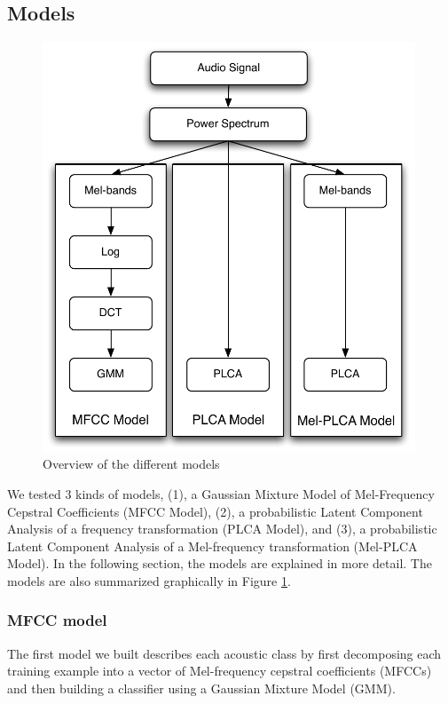 \documentclass[a4paper,11pt,final]{ThesisStyle}
\begin{document}
\subsection{Models}

\begin{figure}
\centering
\includegraphics[width=0.99\textwidth]{images/models.pdf}
\caption{Overview of the different models}
\label{fig:models}
\end{figure}


We tested 3 kinds of models, (1), a Gaussian Mixture Model of Mel-Frequency Cepstral Coefficients (MFCC Model), (2), a probabilistic Latent Component Analysis of a frequency transformation (PLCA Model), and (3), a probabilistic Latent Component Analysis of a Mel-frequency transformation (Mel-PLCA Model).  In the following section, the models are explained in more detail.  The models are also summarized graphically in Figure \ref{fig:models}.

\subsubsection{MFCC model}
The first model we built describes each acoustic class by first decomposing each training example into a vector of Mel-frequency cepstral coefficients (MFCCs) and then building a classifier using a Gaussian Mixture Model (GMM).  
\end{document}
